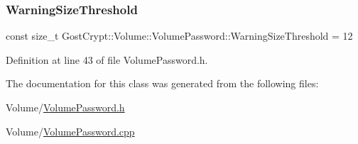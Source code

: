 \subsubsection{\texorpdfstring{Warning\+Size\+Threshold}{WarningSizeThreshold}}
{\footnotesize\ttfamily const size\+\_\+t Gost\+Crypt\+::\+Volume\+::\+Volume\+Password\+::\+Warning\+Size\+Threshold = 12\hspace{0.3cm}{\ttfamily [static]}}



Definition at line 43 of file Volume\+Password.\+h.



The documentation for this class was generated from the following files\+:\begin{DoxyCompactItemize}
\item 
Volume/\hyperlink{_volume_password_8h}{Volume\+Password.\+h}\item 
Volume/\hyperlink{_volume_password_8cpp}{Volume\+Password.\+cpp}\end{DoxyCompactItemize}
